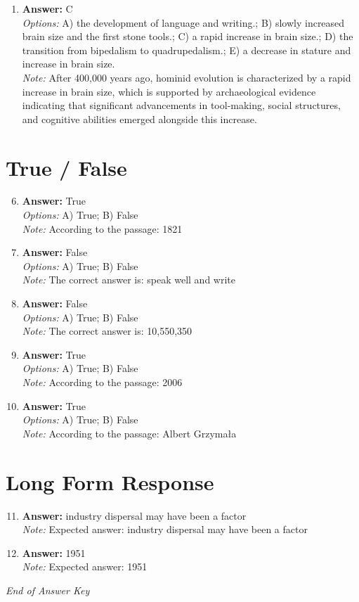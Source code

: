 \documentclass[12pt]{article}
\begin{document}
\begin{enumerate}[label=\arabic*.]
\item \textbf{Answer:} C
\\ \textit{Options:} A) the development of language and writing.; B) slowly increased brain size and the first stone tools.; C) a rapid increase in brain size.; D) the transition from bipedalism to quadrupedalism.; E) a decrease in stature and increase in brain size.
\\ \textit{Note:} After 400,000 years ago, hominid evolution is characterized by a rapid increase in brain size, which is supported by archaeological evidence indicating that significant advancements in tool-making, social structures, and cognitive abilities emerged alongside this increase.
\end{enumerate}

\section*{True / False}
\begin{enumerate}[label=\arabic*.]
\setcounter{enumi}{5}
\item \textbf{Answer:} True
\\ \textit{Options:} A) True; B) False
\\ \textit{Note:} According to the passage: 1821
\item \textbf{Answer:} False
\\ \textit{Options:} A) True; B) False
\\ \textit{Note:} The correct answer is: speak well and write
\item \textbf{Answer:} False
\\ \textit{Options:} A) True; B) False
\\ \textit{Note:} The correct answer is: 10,550,350
\item \textbf{Answer:} True
\\ \textit{Options:} A) True; B) False
\\ \textit{Note:} According to the passage: 2006
\item \textbf{Answer:} True
\\ \textit{Options:} A) True; B) False
\\ \textit{Note:} According to the passage: Albert Grzymała
\end{enumerate}

\section*{Long Form Response}
\begin{enumerate}[label=\arabic*.]
\setcounter{enumi}{10}
\item \textbf{Answer:} industry dispersal may have been a factor
\\ \textit{Note:} Expected answer: industry dispersal may have been a factor
\item \textbf{Answer:} 1951
\\ \textit{Note:} Expected answer: 1951
\end{enumerate}

\vfill
\noindent\textit{End of Answer Key}
\end{document}
